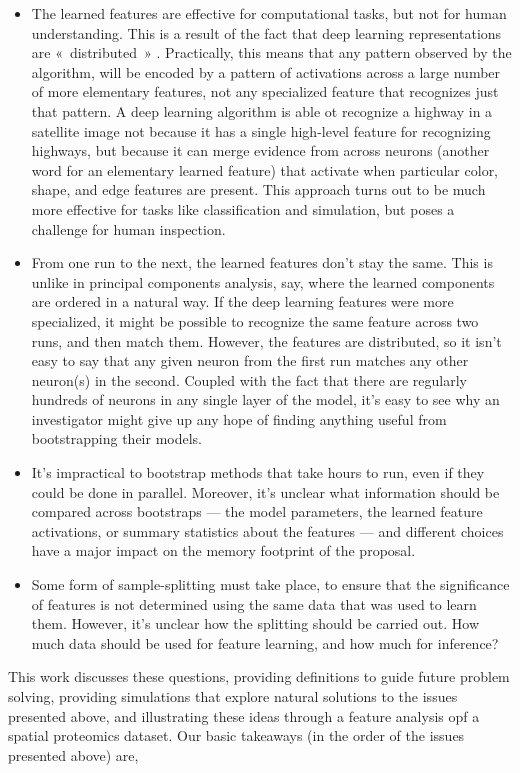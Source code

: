 \begin{itemize}
\item The learned features are effective for computational tasks, but not for human understanding. This is a result of the fact that deep learning representations are « distributed » \cite{mcclelland1986parallel}. Practically, this means that any pattern observed by the algorithm, will be encoded by a pattern of activations across a large number of more elementary features, not any specialized feature that recognizes just that pattern. A deep learning algorithm is able ot recognize a highway in a satellite image not because it has a single high-level feature for recognizing highways, but because it can merge evidence from across neurons (another word for an elementary learned feature) that activate when particular color, shape, and edge features are present. This approach turns out to be much more effective for tasks like classification and simulation, but poses a challenge for human inspection.
\item From one run to the next, the learned features don’t stay the same. This is unlike in principal components analysis, say, where the learned components are ordered in a natural way. If the deep learning features were more specialized, it might be possible to recognize the same feature across two runs, and then match them. However, the features are distributed, so it isn’t easy to say that any given neuron from the first run matches any other neuron(s) in the second. Coupled with the fact that there are regularly hundreds of neurons in any single layer of the model, it’s easy to see why an investigator might give up any hope of finding anything useful from bootstrapping their models.
\item It’s impractical to bootstrap methods that take hours to run, even if they could be done in parallel. Moreover, it’s unclear what information should be compared across bootstraps — the model parameters, the learned feature activations, or summary statistics about the features — and different choices have a major impact on the memory footprint of the proposal.
\item Some form of sample-splitting must take place, to ensure that the significance of features is not determined using the same data that was used to learn them. However, it’s unclear how the splitting should be carried out. How much data should be used for feature learning, and how much for inference? 
\end{itemize}

This work discusses these questions, providing definitions to guide future problem solving, providing simulations that explore natural solutions to the issues presented above, and illustrating these ideas through a feature analysis opf a spatial proteomics dataset. Our basic takeaways (in the order of the issues presented above) are,

